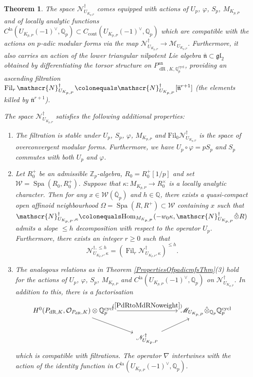 \documentclass[10pt, oneside]{amsart}
\newcommand{\defeq}{\colonequals}
\numberwithin{equation}{subsection}
\newtheorem{thm}[equation]{Theorem}
\theoremstyle{definition}
\theoremstyle{remark}
\newcommand{\mbb}[1]{\mathbb{#1}}
\newcommand{\hatot}{\hat{\otimes}}
\newcommand{\opn}[1]{\operatorname{#1}}
\def\Q{\mathbb{Q}}
\begin{document}
\begin{thm} \label{SheafVersionMainThm} 
The space $\mathscr{N}^{\dagger}_{U_{K_{p, P}}}$ comes equipped with actions of $U_p$, $\varphi$, $S_p$, $M_{K_{p, P}}$ and of locally analytic functions $C^{\opn{la}}(U_{K_{p, P}}(-1)^\vee, \Q_p) \subset C_{\opn{cont}}(U_{K_{p, P}}(-1)^\vee, \Q_p)$ which are compatible with the actions on $p$-adic modular forms via the map $\mathscr{N}^{\dagger}_{U_{K_{p, P}}} \to \mathscr{M}_{U_{K_{p, P}}}$. Furthermore, it also carries an action of the lower triangular nilpotent Lie algebra $\overline{\mathfrak{n}} \subset \mathfrak{gl}_2$ obtained by differentiating the torsor structure on $P_{\opn{dR}, K, \mbb{Q}_p^{\opn{cycl}}}^{\opn{an}}$, providing an ascending filtration $\opn{Fil}_r \mathscr{N}^{\dagger}_{U_{K_{p, P}}} \defeq \mathscr{N}^{\dagger}_{U_{K_{p, P}}}[\overline{\mathfrak{n}}^{r+1}]$ (the elements killed by $\overline{\mathfrak{n}}^{r+1}$).

The space $\mathscr{N}^{\dagger}_{U_{K_{p, P}}}$ satisfies the following additional properties:
\begin{enumerate}
\item The filtration is stable under $U_p$, $S_p$, $\varphi$, $M_{K_{p, P}}$ and $\mathrm{Fil}_0 \mathscr{N}^{\dagger}_{U_{K_{p, P}}}$ is the space of overconvergent modular forms. Furthermore, we have $U_p \circ \varphi = p S_p$ and $S_p$ commutes with both $U_p$ and $\varphi$.
\item Let $R_0^+$ be an admissible $\mbb{Z}_p$-algebra, $R_0 = R_0^+[1/p]$ and set $\mathcal{W} = \opn{Spa}(R_0, R_0^+)$. Suppose that $\kappa \colon M_{K_{p, P}} \rightarrow R_0^\times$ is a locally analytic character. Then for any $x \in \mathcal{W}(\overline{\mbb{Q}}_p)$ and $h \in \mbb{Q}$, there exists a quasi-compact open affinoid neighbourhood $\Omega = \opn{Spa}(R, R^+) \subset \mathcal{W}$ containing $x$ such that $\mathscr{N}^{\dagger}_{U_{K_{p, P}}, \kappa} \defeq \mathrm{Hom}_{M_{K_{p, P}}}(-w_0\kappa, \mathscr{N}^{\dagger}_{U_{K_{p, P}}}\hatot R)$ admits a slope $\leq h$ decomposition with respect to the operator $U_p$. Furthermore, there exists an integer $r \geq 0$ such that
\[
\mathscr{N}^{\dagger, \leq h}_{U_{K_{p, P}}, \kappa} = \left( \opn{Fil}_r \mathscr{N}^{\dagger}_{U_{K_{p, P}}, \kappa} \right)^{\leq h} .
\]
\item The analogous relations as in Theorem \ref{PropertiesOfpadicmfsThm}(3) hold for the actions of $U_p$, $\varphi$, $S_p$, $M_{K_{p, P}}$ and $C^{\opn{la}}(U_{K_{p, P}}(-1)^\vee, \Q_p)$ on $\mathscr{N}^{\dagger}_{U_{K_{p, P}}}$. In addition to this, there is a factorisation
\[
\begin{tikzcd}
H^0(P_{\opn{dR}, K}, \mathcal{O}_{P_{\opn{dR}}, K}) \otimes \Q_p^{\opn{cycl}} \arrow[dr] \arrow[rr, "(\ref{PdRtoMdRNoweight})"] & & \mathscr{M}_{U_{K_{p,P}}} \hatot_{\mbb{Q}_p} \Q_p^{\opn{cycl}} \\
& \mathscr{N}^\dagger_{U_{K_p, P}} \arrow[ur] &             
\end{tikzcd}
\]
which is compatible with filtrations. The operator $\nabla$ intertwines with the action of the identity function in $C^{\opn{la}}(U_{K_{p, P}}(-1)^\vee, \Q_p)$. 
\end{enumerate}
\end{thm}
\end{document}
